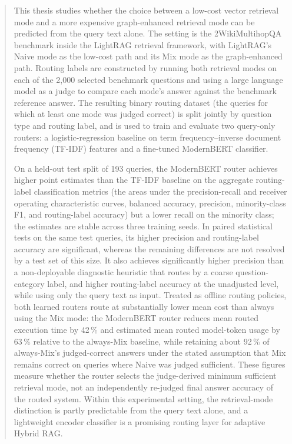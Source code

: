 \documentclass[english, bibtex]{kththesis}               %
\numberwithin{listing}{chapter}
\begin{document}
\begin{abstract}
\begin{scontents}[store-env=abstracts,print-env=true]
This thesis studies whether the choice between a low-cost vector retrieval mode and a more expensive graph-enhanced retrieval mode can be predicted from the query text alone. The setting is the 2WikiMultihopQA benchmark inside the LightRAG retrieval framework, with LightRAG's Naive mode as the low-cost path and its Mix mode as the graph-enhanced path. Routing labels are constructed by running both retrieval modes on each of the 2,000 selected benchmark questions and using a large language model as a judge to compare each mode's answer against the benchmark reference answer. The resulting binary routing dataset (the queries for which at least one mode was judged correct) is split jointly by question type and routing label, and is used to train and evaluate two query-only routers: a logistic-regression baseline on term frequency--inverse document frequency (TF-IDF) features and a fine-tuned ModernBERT classifier.

On a held-out test split of 193 queries, the ModernBERT router achieves higher point estimates than the TF-IDF baseline on the aggregate routing-label classification metrics (the areas under the precision-recall and receiver operating characteristic curves, balanced accuracy, precision, minority-class F1, and routing-label accuracy) but a lower recall on the minority class; the estimates are stable across three training seeds. In paired statistical tests on the same test queries, its higher precision and routing-label accuracy are significant, whereas the remaining differences are not resolved by a test set of this size. It also achieves significantly higher precision than a non-deployable diagnostic heuristic that routes by a coarse question-category label, and higher routing-label accuracy at the unadjusted level, while using only the query text as input. Treated as offline routing policies, both learned routers route at substantially lower mean cost than always using the Mix mode: the ModernBERT router reduces mean routed execution time by 42\,\% and estimated mean routed model-token usage by 63\,\% relative to the always-Mix baseline, while retaining about 92\,\% of always-Mix's judged-correct answers under the stated assumption that Mix remains correct on queries where Naive was judged sufficient. These figures measure whether the router selects the judge-derived minimum sufficient retrieval mode, not an independently re-judged final answer accuracy of the routed system. Within this experimental setting, the retrieval-mode distinction is partly predictable from the query text alone, and a lightweight encoder classifier is a promising routing layer for adaptive Hybrid RAG.
\end{scontents}


\end{abstract}
\end{document}
